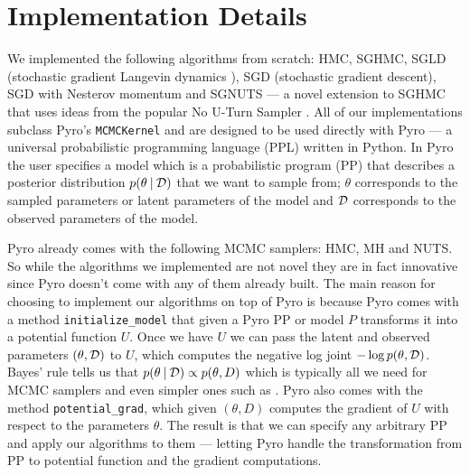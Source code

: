 
\section{Implementation Details}

We implemented the following algorithms from scratch: HMC, SGHMC, SGLD (stochastic gradient Langevin dynamics \cite{sgld}), SGD (stochastic gradient descent), SGD with Nesterov momentum and SGNUTS — a novel extension to SGHMC that uses ideas from the popular No U-Turn Sampler \cite{nuts}. All of our implementations subclass Pyro's \texttt{MCMCKernel} and are designed to be used directly with Pyro \cite{pyro} — a universal probabilistic programming language (PPL) written in Python. In Pyro the user specifies a model which is a probabilistic program (PP) that describes a posterior distribution $p(\theta \: | \: \mathcal{D})$ that we want to sample from; $\theta$ corresponds to the sampled parameters or latent parameters of the model and $\mathcal{D}$ corresponds to the observed parameters of the model. 

Pyro already comes with the following MCMC samplers: HMC, MH and NUTS. So while the algorithms we implemented are not novel they are in fact innovative since Pyro doesn't come with any of them already built. The main reason for choosing to implement our algorithms on top of Pyro is because Pyro comes with a method \texttt{initialize\_model} that given a Pyro PP or model $P$ transforms it into a potential function $U$. Once we have $U$ we can pass the latent and observed parameters $(\theta, \mathcal{D})$ to $U$, which computes the negative log joint $- \log p(\theta, \mathcal{D})$. Bayes' rule tells us that  $p(\theta \: | \: \mathcal{D}) \propto p(\theta, D)$ which is typically all we need for MCMC samplers and even simpler ones such as . Pyro also comes with the method \texttt{potential\_grad}, which given $(\theta, D)$ computes the gradient of $U$ with respect to the parameters $\theta$. The result is that we can specify any arbitrary PP and apply our algorithms to them — letting Pyro handle the transformation from PP to potential function and the gradient computations.

